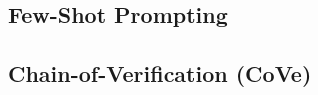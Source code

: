\documentclass[12pt,a4paper,oneside]{report}
\begin{document}
\subsection{Few-Shot Prompting}
\label{subsec:fewshot}

\subsection{Chain-of-Verification (CoVe)}
\label{subsec:cove}
\end{document}
